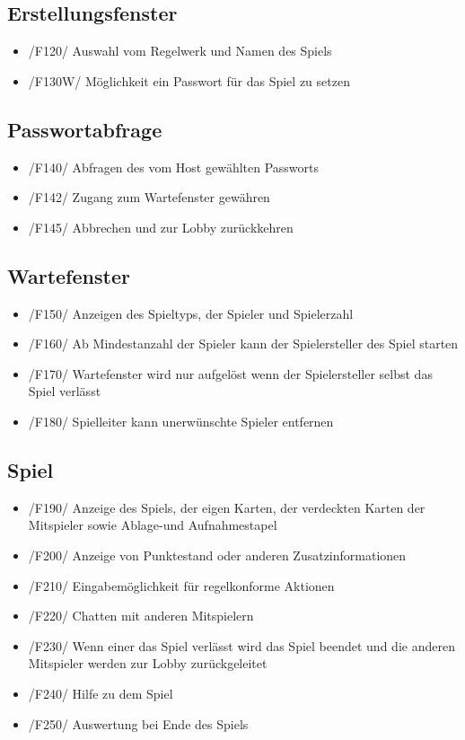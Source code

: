 \documentclass{article}
\begin{document}
\subsection{Erstellungsfenster}
\begin{itemize}
	\item /F120/ Auswahl vom \gls{Regelwerk} und  Namen des Spiels 
	\item /F130W/ Möglichkeit ein Passwort für das Spiel zu setzen
\end{itemize}

\subsection{Passwortabfrage}
\begin{itemize}
	\item /F140/ Abfragen des vom Host gewählten Passworts
	\item /F142/ Zugang zum Wartefenster gewähren
	\item /F145/ Abbrechen und zur Lobby zurückkehren
\end{itemize}

\subsection{Wartefenster}
\begin{itemize}
	\item /F150/ Anzeigen des Spieltyps, der Spieler und Spielerzahl
	\item /F160/ Ab Mindestanzahl der Spieler kann der Spielersteller des Spiel starten
	\item /F170/ Wartefenster wird nur aufgelöst wenn der Spielersteller selbst das Spiel verlässt
	\item /F180/ Spielleiter kann unerwünschte Spieler entfernen
\end{itemize}

\subsection{Spiel}
\begin{itemize}
	\item /F190/ Anzeige des Spiels, der eigen Karten, der verdeckten Karten der Mitspieler sowie Ablage-und Aufnahmestapel
	\item /F200/ Anzeige von Punktestand oder anderen Zusatzinformationen
	\item /F210/ Eingabemöglichkeit für regelkonforme Aktionen
	\item /F220/ Chatten mit anderen Mitspielern
	\item /F230/ Wenn einer das Spiel verlässt wird das Spiel beendet und die anderen Mitspieler werden zur \gls{Lobby} zurückgeleitet
	\item /F240/ Hilfe zu dem Spiel
	\item /F250/ Auswertung bei Ende des Spiels
\end{itemize}
\end{document}
